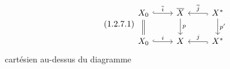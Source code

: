 \begin{equation}\tag{1.2.7.1}
\begin{tikzcd}
X_0 \arrow[r, hook, "\overline{i}"] \arrow[d, equal] & \overline{X} \arrow[d, "p"] & X^* \arrow[l, hook, "\overline{j}"'] \arrow[d, "p'"] \\
X_0 \arrow[r, hook, "i"] & X & X^* \arrow[l, hook, "j"']
\end{tikzcd}
\end{equation}
cartésien au-dessus du diagramme

